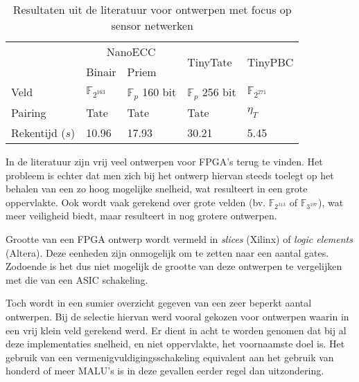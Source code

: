 \begin{table}[h]
	\caption{Resultaten uit de literatuur voor ontwerpen met focus op sensor netwerken}
	\label{tabel-resultaten-sensor}

	\centering
	\begin{tabular}{lllll}
		\toprule
		&	\multicolumn{2}{c}{NanoECC \cite{nanoecc}}	& \multirow{2}{*}{TinyTate \cite{tinytate}}	& \multirow{2}{*}{TinyPBC \cite{tinypbc}}\\
		\cmidrule(r){2-3}
		& Binair	& Priem	&	& \\
 		\midrule
		Veld					& $\mathbb{F}_{2^{163}}$	& $\mathbb{F}_{p}$ 160 bit	& $\mathbb{F}_{p}$ 256 bit	& $\mathbb{F}_{2^{271}}$ \\
		Pairing				& Tate							& Tate							& Tate							& $\eta_T$ \\
		Rekentijd ($s$)	& 	10.96							& 17.93							& 30.21							& 5.45\\
		\bottomrule
	\end{tabular}
\end{table}

In de literatuur zijn vrij veel ontwerpen voor FPGA's terug te vinden. Het probleem is echter dat men zich bij het ontwerp hiervan steeds toelegt op het behalen van een zo hoog mogelijke snelheid, wat resulteert in een grote oppervlakte. Ook wordt vaak gerekend over grote velden (bv. $\mathbb{F}_{2^{313}}$ of $\mathbb{F}_{3^{197}}$), wat meer veiligheid biedt, maar resulteert in nog grotere ontwerpen.

Grootte van een FPGA ontwerp wordt vermeld in \emph{slices} (Xilinx) of \emph{logic elements} (Altera). Deze eenheden zijn onmogelijk om te zetten naar een aantal gates. Zodoende is het dus niet mogelijk de grootte van deze ontwerpen te vergelijken met die van een ASIC schakeling.

Toch wordt in  een sumier overzicht gegeven van een zeer beperkt aantal ontwerpen. Bij de selectie hiervan werd vooral gekozen voor ontwerpen waarin in een vrij klein veld gerekend werd. Er dient in acht te worden genomen dat bij al deze implementaties snelheid, en niet oppervlakte, het voornaamste doel is. Het gebruik van een vermenigvuldigingsschakeling equivalent aan het gebruik van honderd of meer MALU's is in deze gevallen eerder regel dan uitzondering.

